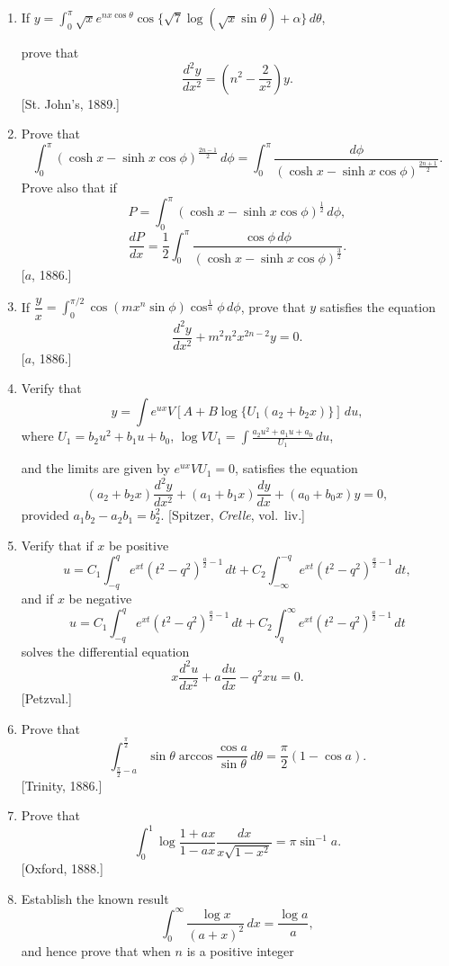 \documentclass[11pt, a4paper]{article}
\newcommand{\source}[1]{\hfill\textnormal{[#1]}}
\begin{document}
\begin{enumerate}[leftmargin=2em]
\item If $y=\displaystyle\int_0^\pi\sqrt{x}e^{nx\cos\theta}\cos\{\sqrt7\log(\sqrt x\sin\theta)+\alpha\}\,d\theta$,

prove that
\[
\frac{d^2y}{dx^2}=\left(n^2-\frac{2}{x^2}\right)y.
\]
\source{St. John's, 1889.}

\item Prove that
\[
\int_0^\pi(\cosh x-\sinh x\cos\phi)^{\frac{2n-1}{2}}\,d\phi=\int_0^\pi\frac{d\phi}{(\cosh x-\sinh x\cos\phi)^{\frac{2n+1}{2}}}.
\]
Prove also that if
\[
P=\int_0^\pi(\cosh x-\sinh x\cos\phi)^{\frac12}\,d\phi,
\]
\[
\frac{dP}{dx}=\frac12\int_0^\pi\frac{\cos\phi\,d\phi}{(\cosh x-\sinh x\cos\phi)^{\frac32}}.
\]
\source{$a$, 1886.}

\item If $\dfrac{y}{x}=\displaystyle\int_0^{\pi/2}\cos(mx^n\sin\phi)\cos^{\frac1n}\phi\,d\phi$, prove that $y$ satisfies the equation
\[
\frac{d^2y}{dx^2}+m^2n^2x^{2n-2}y=0.
\]
\source{$a$, 1886.}

\item Verify that
\[
y=\int e^{ux}V[A+B\log\{U_1(a_2+b_2x)\}]\,du,
\]
where $U_1=b_2u^2+b_1u+b_0$, $\log VU_1=\displaystyle\int\frac{a_2u^2+a_1u+a_0}{U_1}\,du$,

and the limits are given by $e^{ux}VU_1=0$, satisfies the equation
\[
(a_2+b_2x)\frac{d^2y}{dx^2}+(a_1+b_1x)\frac{dy}{dx}+(a_0+b_0x)y=0,
\]
provided $a_1b_2-a_2b_1=b_2^2$. \source{Spitzer, \textit{Crelle}, vol.\ liv.}

\item Verify that if $x$ be positive
\[
u=C_1\int_{-q}^q e^{xt}(t^2-q^2)^{\frac{a}{2}-1}\,dt+C_2\int_{-\infty}^{-q}e^{xt}(t^2-q^2)^{\frac{a}{2}-1}\,dt,
\]
and if $x$ be negative
\[
u=C_1\int_{-q}^q e^{xt}(t^2-q^2)^{\frac{a}{2}-1}\,dt+C_2\int_q^\infty e^{xt}(t^2-q^2)^{\frac{a}{2}-1}\,dt
\]
solves the differential equation
\[
x\frac{d^2u}{dx^2}+a\frac{du}{dx}-q^2xu=0.
\]
\source{Petzval.}

\item Prove that
\[
\int_{\frac{\pi}{2}-a}^{\frac{\pi}{2}}\sin\theta\arccos\frac{\cos a}{\sin\theta}\,d\theta=\frac{\pi}{2}(1-\cos a).
\]
\source{Trinity, 1886.}

\item Prove that
\[
\int_0^1\log\frac{1+ax}{1-ax}\frac{dx}{x\sqrt{1-x^2}}=\pi\sin^{-1}a.
\]
\source{Oxford, 1888.}

\item Establish the known result
\[
\int_0^\infty\frac{\log x}{(a+x)^2}\,dx=\frac{\log a}{a},
\]
and hence prove that when $n$ is a positive integer


\end{enumerate}
\end{document}
